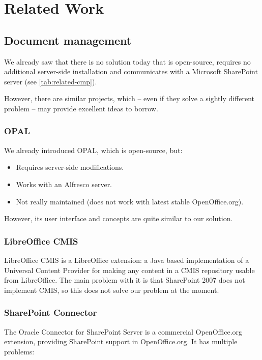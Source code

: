 \chapter{Related Work}

\section{Document management}

We already saw that there is no solution today that is open-source, requires no
additional server-side installation and communicates with a Microsoft
SharePoint server (see \autoref{tab:related-cmp}).

However, there are similar projects, which -- even if they
solve a sightly different problem -- may provide excellent ideas to borrow.

\subsection*{OPAL}
We already introduced OPAL, which is open-source, but:

\begin{itemize}
\item Requires server-side modifications.
\item Works with an Alfresco server.
\item Not really maintained (does not work with latest stable OpenOffice.org).
\end{itemize}

However, its user interface and concepts are quite similar to our solution.

\subsection*{LibreOffice CMIS}
LibreOffice CMIS \cite{locmis} is a LibreOffice extension: a Java based
implementation of a Universal Content Provider for making any content in a CMIS
repository usable from LibreOffice. The main problem with it is that SharePoint
2007 does not implement CMIS, so this does not solve our problem at the moment.

\subsection*{SharePoint Connector}
The Oracle Connector for SharePoint Server \cite{oracle-sp-connector} is a
commercial OpenOffice.org extension, providing SharePoint support in
OpenOffice.org. It has multiple problems:

